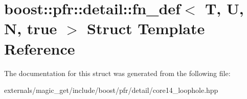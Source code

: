 \hypertarget{structboost_1_1pfr_1_1detail_1_1fn__def_3_01_t_00_01_u_00_01_n_00_01true_01_4}{}\section{boost\+:\+:pfr\+:\+:detail\+:\+:fn\+\_\+def$<$ T, U, N, true $>$ Struct Template Reference}
\label{structboost_1_1pfr_1_1detail_1_1fn__def_3_01_t_00_01_u_00_01_n_00_01true_01_4}


The documentation for this struct was generated from the following file\+:\begin{DoxyCompactItemize}
\item 
externals/magic\+\_\+get/include/boost/pfr/detail/core14\+\_\+loophole.\+hpp\end{DoxyCompactItemize}
